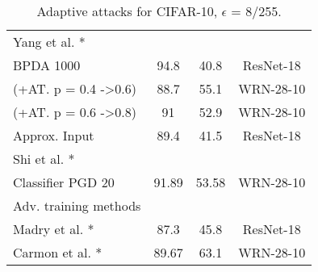 \begin{table}[th]
\begin{tabular}{lccc}
Yang et al. \cite{yang2019me}*             &                             &                            &                       \\
\qquad BPDA 1000                        & 94.8                        & 40.8                       & ResNet-18             \\
\qquad (+AT. p = 0.4 -\textgreater 0.6)             & 88.7                        & 55.1                       & WRN-28-10             \\
\qquad (+AT. p = 0.6 -\textgreater 0.8) & 91                          & 52.9                       & WRN-28-10             \\
\qquad Approx. Input                    & 89.4                        & 41.5                       & ResNet-18             \\
Shi et al. \cite{shi2020online}*              &                             &                            &                       \\
\qquad Classifier PGD 20                & 91.89                       & 53.58                      & WRN-28-10             \\ \hline
Adv. training methods     &                             &                            &                       \\
Madry et al. \cite{madry2018towards}*            & 87.3                        & 45.8                       & ResNet-18             \\
Carmon et al. \cite{carmon2019unlabeled}*            & 89.67                       & 63.1                       & WRN-28-10             \\ \hline
\end{tabular}
\caption{Adaptive attacks for CIFAR-10, \( \epsilon \) = {8}/{255}.}\label{adaptive-attacks}
\end{table}